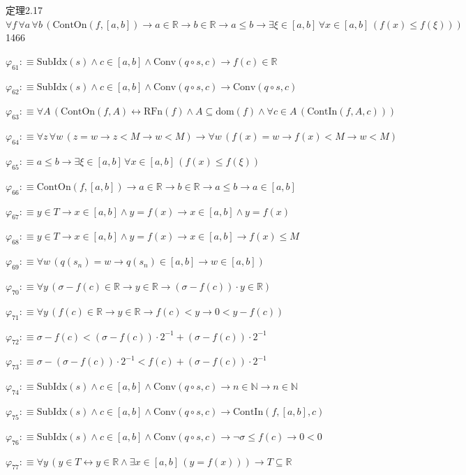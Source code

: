 \begin{fullproof}{定理2.17}{$\forall f\,\forall a\,\forall b\,(\mathrm{ContOn}(f,[a,b]) \to a \in \mathbb{R} \to b \in \mathbb{R} \to a \leq b \to \exists \xi \in [a,b]\,\forall x \in [a,b]\,(f(x) \leq f(\xi)))$}{1466}
\begin{abbrevlist}
\item $\varphi_{61} :\equiv \mathrm{SubIdx}(s) \land c \in [a,b] \land \mathrm{Conv}(q \circ s,c) \to f(c) \in \mathbb{R}$
\item $\varphi_{62} :\equiv \mathrm{SubIdx}(s) \land c \in [a,b] \land \mathrm{Conv}(q \circ s,c) \to \mathrm{Conv}(q \circ s,c)$
\item $\varphi_{63} :\equiv \forall A\,(\mathrm{ContOn}(f,A) \leftrightarrow \mathrm{RFn}(f) \land A \subseteq \mathrm{dom}(f) \land \forall c \in A\,(\mathrm{ContIn}(f,A,c)))$
\item $\varphi_{64} :\equiv \forall z\,\forall w\,(z = w \to z < M \to w < M) \to \forall w\,(f(x) = w \to f(x) < M \to w < M)$
\item $\varphi_{65} :\equiv a \leq b \to \exists \xi \in [a,b]\,\forall x \in [a,b]\,(f(x) \leq f(\xi))$
\item $\varphi_{66} :\equiv \mathrm{ContOn}(f,[a,b]) \to a \in \mathbb{R} \to b \in \mathbb{R} \to a \leq b \to a \in [a,b]$
\item $\varphi_{67} :\equiv y \in T \to x \in [a,b] \land y = f(x) \to x \in [a,b] \land y = f(x)$
\item $\varphi_{68} :\equiv y \in T \to x \in [a,b] \land y = f(x) \to x \in [a,b] \to f(x) \leq M$
\item $\varphi_{69} :\equiv \forall w\,(q(s_{n}) = w \to q(s_{n}) \in [a,b] \to w \in [a,b])$
\item $\varphi_{70} :\equiv \forall y\,(\sigma - f(c) \in \mathbb{R} \to y \in \mathbb{R} \to (\sigma - f(c)) \cdot y \in \mathbb{R})$
\item $\varphi_{71} :\equiv \forall y\,(f(c) \in \mathbb{R} \to y \in \mathbb{R} \to f(c) < y \to 0 < y - f(c))$
\item $\varphi_{72} :\equiv \sigma - f(c) < (\sigma - f(c)) \cdot 2^{-1} + (\sigma - f(c)) \cdot 2^{-1}$
\item $\varphi_{73} :\equiv \sigma - (\sigma - f(c)) \cdot 2^{-1} < f(c) + (\sigma - f(c)) \cdot 2^{-1}$
\item $\varphi_{74} :\equiv \mathrm{SubIdx}(s) \land c \in [a,b] \land \mathrm{Conv}(q \circ s,c) \to n \in \mathbb{N} \to n \in \mathbb{N}$
\item $\varphi_{75} :\equiv \mathrm{SubIdx}(s) \land c \in [a,b] \land \mathrm{Conv}(q \circ s,c) \to \mathrm{ContIn}(f,[a,b],c)$
\item $\varphi_{76} :\equiv \mathrm{SubIdx}(s) \land c \in [a,b] \land \mathrm{Conv}(q \circ s,c) \to \neg \sigma \leq f(c) \to 0 < 0$
\item $\varphi_{77} :\equiv \forall y\,(y \in T \leftrightarrow y \in \mathbb{R} \land \exists x \in [a,b]\,(y = f(x))) \to T \subseteq \mathbb{R}$

\end{abbrevlist}
\end{fullproof}
